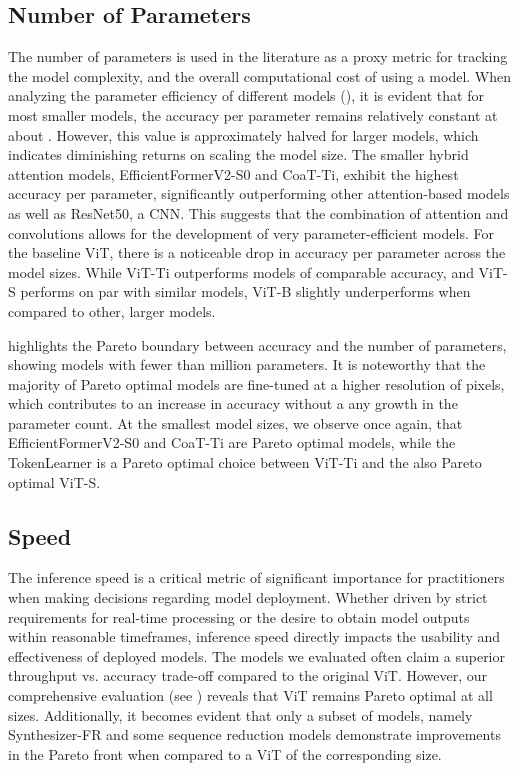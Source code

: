 \subsection{Number of Parameters}
The number of parameters 
is
used in the literature as a proxy metric for tracking the model complexity, and the overall computational cost of using a model.
When analyzing the parameter efficiency of different models (), it is evident that for most smaller models, the accuracy per parameter remains relatively constant at about . 
However, this value is approximately halved for larger models, which indicates diminishing returns on scaling the model size.
The smaller hybrid attention models, EfficientFormerV2-S0 and CoaT-Ti, exhibit the highest accuracy per parameter,
significantly outperforming
other attention-based models as well as ResNet50, a CNN. This 
suggests that the combination of attention and convolutions allows for the development of 
very parameter-efficient models.
For
the baseline ViT, there is a noticeable drop in accuracy per parameter across 
the
model sizes. While ViT-Ti 
outperforms
models of comparable accuracy, and ViT-S performs on par with similar models, ViT-B slightly underperforms when compared to other, larger models. 

 highlights the Pareto boundary between accuracy and the number of parameters, showing models with fewer than  million parameters.
It is noteworthy that the majority of Pareto optimal models are fine-tuned at a higher resolution of  pixels, which contributes to an increase in accuracy without a any growth in the parameter count. 
At the smallest model sizes, we observe once again, that EfficientFormerV2-S0 and CoaT-Ti are Pareto optimal models,
while the TokenLearner is a Pareto optimal choice between ViT-Ti and the also Pareto optimal ViT-S.


\subsection{Speed}
The inference speed is a critical metric of significant importance for practitioners when making decisions regarding model deployment. 
Whether driven by strict requirements for real-time processing 
or the desire to obtain model outputs within reasonable timeframes, inference speed directly impacts the usability and effectiveness of deployed models. 
The models we evaluated often claim a superior 
throughput vs. accuracy trade-off
compared to the original ViT. 
However, our comprehensive evaluation (see ) reveals that ViT remains Pareto optimal at all sizes.
Additionally, it becomes evident that only a subset of models, namely Synthesizer-FR and 
some sequence reduction models
demonstrate improvements in the Pareto front when compared to a ViT of the corresponding size.

